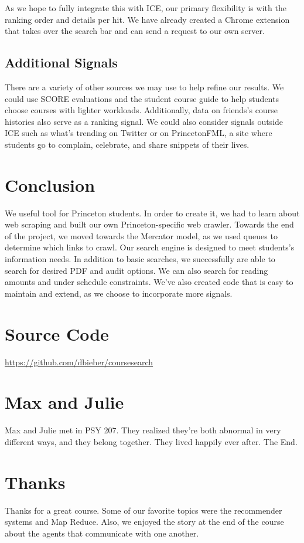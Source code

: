 \documentclass[12pt,letterpaper]{article}
\begin{document}
As we hope to fully integrate this with ICE, our primary flexibility is with the ranking order and details per hit. We have already created a Chrome extension that takes over the search bar and can send a request to our own server.  

\subsection{Additional Signals}

There are a variety of other sources we may use to help refine our results. We could use SCORE evaluations and the student course guide to help students choose courses with lighter workloads. Additionally, data on friends's course histories also serve as a ranking signal. We could also consider signals outside ICE such as what's trending on Twitter or on PrincetonFML, a site where students go to complain, celebrate, and share snippets of their lives. 

\section{Conclusion}

We useful tool for Princeton students. In order to create it, we had to learn about web scraping and built our own Princeton-specific web crawler. Towards the end of the project, we moved towards the Mercator model, as we used queues to determine which links to crawl. Our search engine is designed to meet students's information needs. In addition to basic searches, we successfully are able to search for desired PDF and audit options. We can also search for reading amounts and under schedule constraints. We've also created code that is easy to maintain and extend, as we choose to incorporate more signals.


\appendix

\section{Source Code}
\url{https://github.com/dbieber/coursesearch}

\section{Max and Julie}
Max and Julie met in PSY 207. They realized they're both abnormal in very different ways, and they belong together. They lived happily ever after. The End.

\section{Thanks}
Thanks for a great course. Some of our favorite topics were the recommender systems and Map Reduce. Also, we enjoyed the story at the end of the course about the agents that communicate with one another. 
\end{document}
